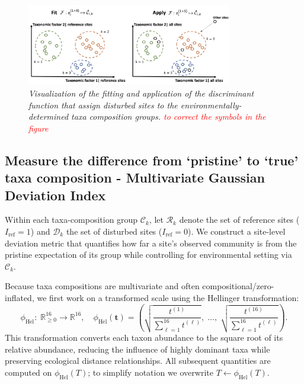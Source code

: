 \begin{figure}
\centering
\includegraphics[width=0.8\textwidth]{../presentation/figures/p12_fit_apply_discriminant_function.png}
\caption{\textit{Visualization of the fitting and application of the discriminant function that assign disturbed sites to the environmentally-determined taxa composition groups.
\textcolor{red}{to correct the symbols in the figure}}}
\label{fig:p12_fit_apply_discriminant_function}
\end{figure}

\subsection{Measure the difference from `pristine' to `true' taxa composition - Multivariate Gaussian Deviation Index }

Within each taxa-composition group $\mathcal{C}_k$, let $\mathcal{R}_k$ denote the set of reference sites ($I_{\text{ref}}=1$) and $\mathcal{D}_k$ the set of disturbed sites ($I_{\text{ref}}=0$).
We construct a site-level deviation metric that quantifies how far a site's observed community is from the pristine expectation of its group while controlling for environmental setting via $\mathcal{C}_k$.

Because taxa compositions are multivariate and often compositional/zero-inflated, 
we first work on a transformed scale using the Hellinger transformation:
\[
\phi_{\mathrm{Hel}}:\;\mathbb{R}^{16}_{\ge 0}\rightarrow\mathbb{R}^{16}, \quad
\phi_{\mathrm{Hel}}(\mathbf{t})=
\left(
\sqrt{\frac{t^{(1)}}{\sum_{\ell=1}^{16} t^{(\ell)}}},\;
\dots,\;
\sqrt{\frac{t^{(16)}}{\sum_{\ell=1}^{16} t^{(\ell)}}}
\right).
\]
This transformation converts each taxon abundance to the square root of its relative abundance, 
reducing the influence of highly dominant taxa while preserving ecological distance relationships.
All subsequent quantities are computed on $\phi_{\mathrm{Hel}}(T)$; 
to simplify notation we overwrite $T \leftarrow \phi_{\mathrm{Hel}}(T)$.

